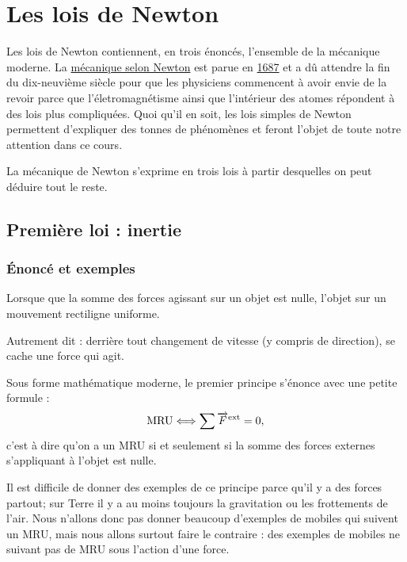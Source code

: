 \section{Les lois de Newton}

Les lois de Newton contiennent, en trois énoncés, l'ensemble de la mécanique moderne. La \href{http://fr.wikipedia.org/wiki/Philosophiae\_Naturalis\_Principia\_Mathematica}{mécanique selon Newton} est parue en \href{http://fr.wikipedia.org/wiki/1687}{1687} et a dû attendre la fin du dix-neuvième siècle pour que les physiciens commencent à avoir envie de la revoir parce que l'életromagnétisme ainsi que l'intérieur des atomes répondent à des lois plus compliquées. Quoi qu'il en soit, les lois simples de Newton permettent d'expliquer des tonnes de phénomènes et feront l'objet de toute notre attention dans ce cours.

La mécanique de Newton s'exprime en trois lois à partir desquelles on peut déduire tout le reste.

\subsection{Première loi : inertie}

\subsubsection{Énoncé et exemples}

\setcounter{numloiphyz}{0}
\begin{loiphyz}
Lorsque que la somme des forces agissant sur un objet est nulle, l'objet sur un mouvement rectiligne uniforme.
\end{loiphyz}
Autrement dit : derrière tout changement de vitesse (y compris de direction), se cache une force qui agit.

Sous forme mathématique moderne, le premier principe s'énonce avec une petite formule :
\begin{equation}
 \mathrm{MRU}\Longleftrightarrow \sum \overrightarrow{F}^{\mathrm{ext}}=0,
\end{equation}
c'est à dire qu'on a un MRU si et seulement si la somme des forces externes s'appliquant à l'objet est nulle.

Il est difficile de donner des exemples de ce principe parce qu'il y a des forces partout; sur Terre il y a au moins toujours la gravitation ou les frottements de l'air. Nous n'allons donc pas donner beaucoup d'exemples de mobiles qui suivent un MRU, mais nous allons surtout faire le contraire : des exemples de mobiles ne suivant pas de MRU sous l'action d'une force.


